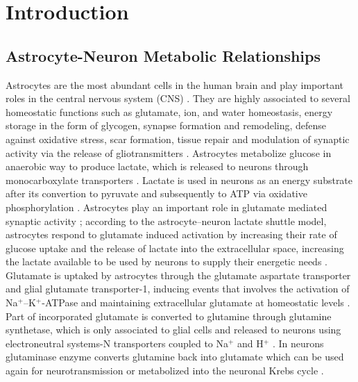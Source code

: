 \section{Introduction}
\subsection*{Astrocyte-Neuron Metabolic Relationships}
Astrocytes are the most abundant cells in the human brain and play important roles in the central nervous system (CNS) \cite{Takuma2004}. They are highly associated to several homeostatic functions such as glutamate, ion, and water homeostasis, energy storage in the form of glycogen, synapse formation and remodeling, defense against oxidative stress, scar formation, tissue repair and modulation of synaptic activity via the release of gliotransmitters \cite{Lange2012}.
Astrocytes metabolize glucose in anaerobic way to produce lactate, which is released to neurons through monocarboxylate transporters \cite{Kimelberg2010}. Lactate is used in neurons as an energy substrate after its convertion to pyruvate and subsequently to ATP via oxidative phosphorylation \cite{Allen2009}.
Astrocytes play an important role in glutamate mediated synaptic activity \cite{Halassa2010}; according to the astrocyte–neuron lactate shuttle model, astrocytes respond to glutamate induced activation by increasing their rate of glucose uptake and the release of lactate into the extracellular space, increasing the lactate available to be used by neurons to supply their energetic needs \cite{Giaume2010}. Glutamate is uptaked by astrocytes through the glutamate aspartate transporter and glial glutamate transporter-1, inducing events that involves the activation of Na$^+$–K$^+$-ATPase and maintaining extracellular glutamate at homeostatic levels \cite{Nijboer2013}. Part of incorporated glutamate is converted to glutamine through glutamine synthetase, which is only associated to glial cells and released to neurons using electroneutral systems-N transporters coupled to Na$^+$ and H$^+$ \cite{Barres2008}. In neurons glutaminase enzyme converts glutamine back into glutamate which can be used again for neurotransmission or metabolized into the neuronal Krebs cycle \cite{Shen2013}.

